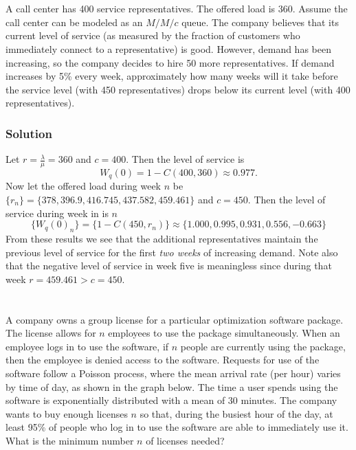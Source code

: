\documentclass[letterpaper]{amsart}
\begin{document}
\section{} %
A call center has 400 service representatives. The offered load is 360. Assume the
call center can be modeled as an $M/M/c$ queue. The company believes that its
current level of service (as measured by the fraction of customers who
immediately connect to a representative) is good. However, demand has been
increasing, so the company decides to hire 50 more representatives. If demand
increases by 5\% every week, approximately how many weeks will it take before
the service level (with 450 representatives) drops below its current level (with 400
representatives).

\subsubsection*{Solution}

Let $r=\frac{\lambda}{\mu} = 360$ and $c=400$.
Then the level of service is
\begin{equation*}
  W_q(0) = 1-C(400,360)\approx 0.977.
\end{equation*}
Now let the offered load during week $n$ be $\{r_n\}=\{378, 396.9, 416.745, 437.582,
459.461\}$ and $c=450$.
Then the level of service during week in is $n$
\begin{equation*}
  \{W_q(0)_n\} = \{1-C(450,r_n)\}\approx
  \{1.000, 0.995, 0.931, 0.556, -0.663\}
\end{equation*}
From these results we see that the additional representatives maintain the
previous level of service for the first \emph{two weeks} of increasing demand.
Note also that the negative level of service in week five is meaningless since
during that week $r=459.461>c=450$.

\section{} %
A company owns a group license for a particular optimization software package.
The license allows for $n$ employees to use the package simultaneously. When an
employee logs in to use the software, if $n$ people are currently using the package,
then the employee is denied access to the software. Requests for use of the
software follow a Poisson process, where the mean arrival rate (per hour) varies
by time of day, as shown in the graph below. The time a user spends using the
software is exponentially distributed with a mean of 30 minutes. The company
wants to buy enough licenses $n$ so that, during the busiest hour of the day, at least
95\% of people who log in to use the software are able to immediately use it. What
is the minimum number $n$ of licenses needed?
\end{document}
